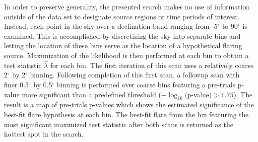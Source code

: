 \documentclass[manuscript]{aastex}
\begin{document}
In order to preserve generality, the presented search makes no use of information outside of the data set to designate source regions or time periods of interest. Instead, each point in the sky over a declination band ranging from -5$^{\circ}$ to 90$^{\circ}$ is examined. This is accomplished by discretizing the sky into separate bins and letting the location of these bins serve as the location of a hypothetical flaring source. Maximization of the likelihood is then performed at each bin to obtain a test statistic $\hat{\lambda}$ for each bin. The first iteration of this scan uses a relatively coarse 2$^{\circ}$ by 2$^{\circ}$ binning. Following completion of this first scan, a followup scan with finer 0.5$^{\circ}$ by 0.5$^{\circ}$ binning is performed over coarse bins featuring a pre-trials p-value more significant than a predefined threshold ($-\log_{10}($p-value$) > 1.75$). The result is a map of pre-trials p-values which shows the estimated significance of the best-fit flare hypothesis at each bin. The best-fit flare from the bin featuring the most significant maximized test statistic after both scans is returned as the hottest spot in the search.
\end{document}
